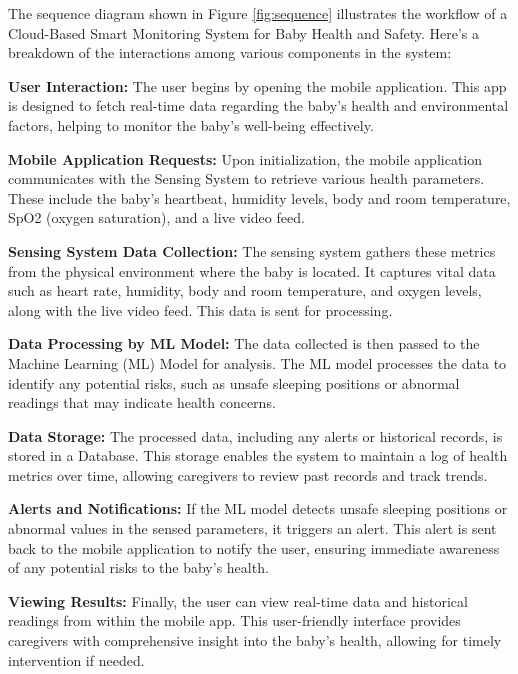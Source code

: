 \documentclass[12pt,a4paper]{report}
\begin{document}
The sequence diagram shown in Figure \ref{fig:sequence} illustrates the workflow of a Cloud-Based Smart Monitoring System for Baby Health and Safety. Here’s a breakdown of the interactions among various components in the system:

\textbf{User Interaction:} The user begins by opening the mobile application. This app is designed to fetch real-time data regarding the baby’s health and environmental factors, helping to monitor the baby’s well-being effectively.

\textbf{Mobile Application Requests:} Upon initialization, the mobile application communicates with the Sensing System to retrieve various health parameters. These include the baby’s heartbeat, humidity levels, body and room temperature, SpO2 (oxygen saturation), and a live video feed.

\textbf{Sensing System Data Collection:} The sensing system gathers these metrics from the physical environment where the baby is located. It captures vital data such as heart rate, humidity, body and room temperature, and oxygen levels, along with the live video feed. This data is sent for processing.

\textbf{Data Processing by ML Model:} The data collected is then passed to the Machine Learning (ML) Model for analysis. The ML model processes the data to identify any potential risks, such as unsafe sleeping positions or abnormal readings that may indicate health concerns.

\textbf{Data Storage:} The processed data, including any alerts or historical records, is stored in a Database. This storage enables the system to maintain a log of health metrics over time, allowing caregivers to review past records and track trends.

\textbf{Alerts and Notifications:} If the ML model detects unsafe sleeping positions or abnormal values in the sensed parameters, it triggers an alert. This alert is sent back to the mobile application to notify the user, ensuring immediate awareness of any potential risks to the baby’s health.

\textbf{Viewing Results:} Finally, the user can view real-time data and historical readings from within the mobile app. This user-friendly interface provides caregivers with comprehensive insight into the baby’s health, allowing for timely intervention if needed.
\end{document}
